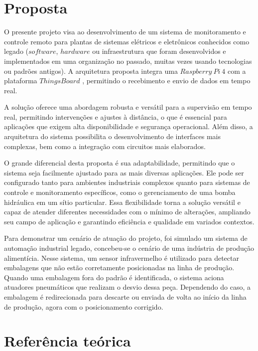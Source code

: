 \documentclass{ecatfg}
\begin{document}
\section{Proposta}
O presente projeto visa ao desenvolvimento de um sistema de monitoramento e controle remoto para plantas de sistemas elétricos e eletrônicos conhecidos como legado ($software$, $hardware$ ou infraestrutura que foram desenvolvidos e implementados em uma organização no passado, muitas vezes usando tecnologias ou padrões antigos). A arquitetura proposta integra uma $Raspberry\ Pi\ 4$ \cite{rasp} com a plataforma $ThingsBoard$ \cite{thingsBoard}, permitindo o recebimento e envio de dados em tempo real. \par
A solução oferece uma abordagem robusta e versátil para a supervisão em tempo real, permitindo intervenções e ajustes à distância, o que é essencial para aplicações que exigem alta disponibilidade e segurança operacional. Além disso, a arquitetura do sistema possibilita o desenvolvimento de interfaces mais complexas, bem como a integração com circuitos mais elaborados.\par
O grande diferencial desta proposta é sua adaptabilidade, permitindo que o sistema seja facilmente ajustado para as mais diversas aplicações. Ele pode ser configurado tanto para ambientes industriais complexos quanto para sistemas de controle e monitoramento específicos, como o gerenciamento de uma bomba hidráulica em um sítio particular. Essa flexibilidade torna a solução versátil e capaz de atender diferentes necessidades com o mínimo de alterações, ampliando seu campo de aplicação e garantindo eficiência e qualidade em variados contextos.\par
Para demonstrar um cenário de atuação do projeto, foi simulado um sistema de automação industrial legado, concebeu-se o cenário de uma indústria de produção alimentícia. Nesse sistema, um sensor infravermelho é utilizado para detectar embalagens que não estão corretamente posicionadas na linha de produção. Quando uma embalagem fora do padrão é identificada, o sistema aciona atuadores pneumáticos que realizam o desvio dessa peça. Dependendo do caso, a embalagem é redirecionada para descarte ou enviada de volta ao início da linha de produção, agora com o posicionamento corrigido. \par

\section{Referência teórica}
\end{document}
